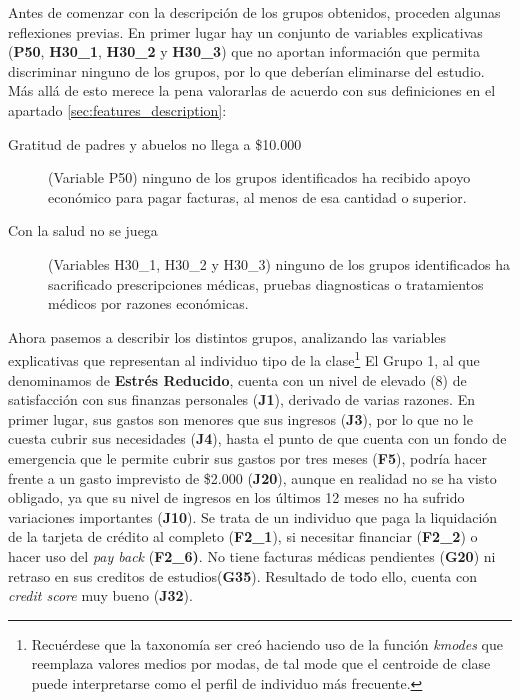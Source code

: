 \documentclass[a4paper, 11pt]{article}
\begin{document}
Antes de comenzar con la descripción de los grupos obtenidos, proceden algunas reflexiones 
previas. En primer lugar hay un conjunto de variables explicativas (\textbf{P50}, 
\textbf{H30\_1}, \textbf{H30\_2} y \textbf{H30\_3}) que no aportan información que permita
discriminar ninguno de los grupos, por lo que deberían eliminarse del estudio. Más allá de 
esto merece la pena valorarlas de acuerdo con sus definiciones en el apartado
\ref{sec:features_description}:
\begin{description}
    \item[Gratitud de padres y abuelos no llega a \$10.000] (Variable P50) ninguno de 
    los grupos identificados ha recibido apoyo económico para pagar facturas, al menos de esa 
    cantidad o superior.
    \item[Con la salud no se juega] (Variables H30\_1, H30\_2 y H30\_3) ninguno de los grupos 
    identificados ha sacrificado prescripciones médicas, pruebas diagnosticas o tratamientos 
    médicos por razones económicas.
\end{description}

Ahora pasemos a describir los distintos grupos, analizando las variables explicativas que 
representan al individuo tipo de la clase\footnote{Recuérdese que la taxonomía ser creó haciendo
uso de la función \textit{kmodes} que reemplaza valores medios por modas, de tal mode que el centroide
de clase puede interpretarse como el perfil de individuo más frecuente.} El Grupo 1, al que
denominamos de \textbf{Estrés Reducido}, cuenta con un nivel de elevado (8) de satisfacción
con sus finanzas personales (\textbf{J1}), derivado de varias razones. En primer lugar, sus gastos
son menores que sus ingresos (\textbf{J3}), por lo que no le cuesta cubrir sus necesidades 
(\textbf{J4}), hasta el punto de que cuenta con un fondo de emergencia que le permite cubrir
sus gastos por tres meses (\textbf{F5}), podría hacer frente a un gasto imprevisto de \$2.000
(\textbf{J20}), aunque en realidad no se ha visto obligado, ya que su nivel de ingresos en los
últimos 12 meses no ha sufrido variaciones importantes (\textbf{J10}). Se trata de un individuo
que paga la liquidación de la tarjeta de crédito al completo (\textbf{F2\_1}), si necesitar 
financiar (\textbf{F2\_2}) o hacer uso del \textit{pay back} (\textbf{F2\_6)}. No tiene facturas
médicas pendientes (\textbf{G20}) ni retraso en sus creditos de estudios(\textbf{G35}).
Resultado de todo ello, cuenta con \textit{credit score} muy bueno (\textbf{J32}). 
\end{document}
